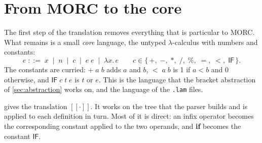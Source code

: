 \documentclass[11pt,a4paper]{article}
\newcommand{\cmb}[1]{\textsf{#1}}
\newcommand{\IF}{\cmb{IF}}
\theoremstyle{definition}
\theoremstyle{plain}
\newcommand{\tr}[1]{[\![#1]\!]}
\newcommand{\kw}[1]{\textbf{#1}}
\begin{document}
\section{From MORC to the core}\label{sec:core}

The first step of the translation removes everything that is particular to
MORC. What remains is a small \emph{core} language, the untyped
$\lambda$-calculus with numbers and constants:
\[
  e \;::=\; x \;\mid\; n \;\mid\; c \;\mid\; e\;e \;\mid\; \lambda x.\,e
  \qquad c \in \{\,{+},\;{-},\;{*},\;{/},\;{\%},\;{=},\;{<},\;\IF\,\}.
\]
The constants are curried: ${+}\;a\;b$ adds $a$ and $b$, ${<}\;a\;b$ is 1 if
$a<b$ and 0 otherwise, and $\IF\;c\;t\;e$ is $t$ or $e$. This is the language
that the bracket abstraction of \cref{sec:abstraction} works on, and the
language of the \texttt{.lam} files.

 gives the translation $\tr{\cdot}$. It works on the tree that
the parser builds and is applied to each definition in turn. Most of it is
direct: an infix operator becomes the corresponding constant applied to the
two operands, and \kw{if} becomes the constant $\IF$.
\end{document}
